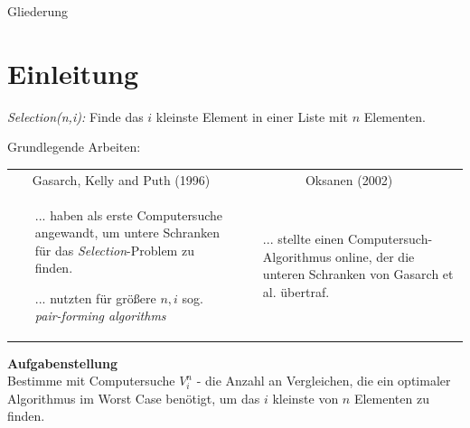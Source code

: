 
\begin{frame}{Gliederung}
  \tableofcontents[hideallsubsections]
\end{frame}


\section{Einleitung}
\begin{frame}{\insertsection}
  \textit{Selection(n,i):} Finde das $i$ kleinste Element in einer Liste mit $n$ Elementen.

  \vspace{5mm}
  Grundlegende Arbeiten:

  \vspace{2mm}
  \begin{tabular}{|p{6cm}|p{6cm}|}
    \hline
    \multicolumn{1}{|c|}{Gasarch, Kelly and Puth (1996)}                                                                  & \multicolumn{1}{c|}{Oksanen (2002)} \\
    \cline{1-2}
    \raggedright \begin{itemize}
                   \item [...]haben als erste Computersuche angewandt, um untere Schranken für das \textit{Selection}-Problem zu finden.
                   \item [...]nutzten für größere $n,i$ sog. \textit{pair-forming algorithms}
                 \end{itemize} &
    \begin{itemize}
      \item[...] stellte einen Computersuch-Algorithmus online, der die unteren Schranken von Gasarch et al. übertraf.
    \end{itemize}                                             \\
    \cline{1-2}
  \end{tabular}
\end{frame}

\begin{frame}{\insertsection}
  \textbf{Aufgabenstellung} \\
  \vspace{5mm}
  Bestimme mit Computersuche $V_i^n$ - die Anzahl an Vergleichen, die ein optimaler Algorithmus im Worst Case benötigt, um das $i$ kleinste von $n$ Elementen zu finden.

\end{frame}


